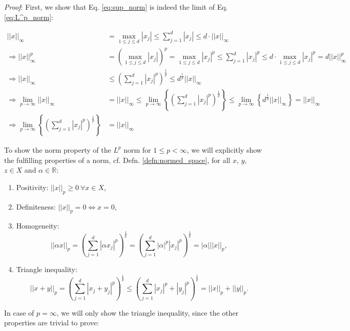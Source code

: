 \documentclass[12pt, a4paper]{article}
\numberwithin{equation}{section}
\theoremstyle{definition}
\theoremstyle{definition}
\newcommand{\norm}[2]{\left\vert\left\vert #1 \right\vert\right\vert_{#2}}
\newcommand{\abs}[1]{\left\vert #1 \right\vert}
\begin{document}
	\noindent\textit{Proof}: First, we show that Eq. \eqref{eq:sup_norm} is indeed the limit of Eq. \eqref{eq:L^p_norm}:
	
	\begin{align}
		\norm{x}{\infty} &= \max_{1\leq j\leq d}{\abs{x_j}} \leq \sum_{j=1}^{d}\abs{x_j} \leq d \cdot \norm{x}{\infty}
		\\ \Rightarrow \norm{x}{\infty}^p &= \left(\max_{1\leq j\leq d}{\abs{x_j}}\right)^p = \max_{1\leq j\leq d}{\abs{x_j}^p} \leq \sum_{j=1}^{d}\abs{x_j}^p \leq d \cdot \max_{1\leq j\leq d}{\abs{x_j}^p} = d\norm{x}{\infty}^p
		\\ \Rightarrow \norm{x}{\infty} &\leq \left(\sum_{j=1}^{d}\abs{x_j}^p\right)^{\frac{1}{p}} \leq d^{\frac{1}{p}}\norm{x}{\infty}
		\\ \Rightarrow \lim\limits_{p\to\infty}\norm{x}{\infty} &= \norm{x}{\infty} \leq \lim\limits_{p\to\infty}\left\{\left(\sum_{j=1}^{d}\abs{x_j}^p\right)^{\frac{1}{p}}\right\} \leq \lim\limits_{p\to\infty}\left\{d^{\frac{1}{p}}\norm{x}{\infty}\right\} = \norm{x}{\infty}
		\\ \Rightarrow \lim\limits_{p\to\infty}\left\{\left(\sum_{j=1}^{d}\abs{x_j}^p\right)^{\frac{1}{p}}\right\} &= \norm{x}{\infty}
	\end{align}

	To show the norm property of the $L^p$ norm for $1 \leq p < \infty$, we will explicitly show the fulfilling properties of a norm, cf. Defn. \eqref{defn:normed_space}, for all $x$, $y$, $z\in X$ and $\alpha\in \mathbb{R}$:

	\begin{enumerate}
		\item Positivity: $\norm{x}{p} \geq 0 \ \forall x\in X$,
		\item Definiteness: $\norm{x}{p} = 0\Leftrightarrow x = 0$,
		\item Homogeneity: $$\norm{\alpha x}{p} = \left(\sum_{j=1}^{d}\abs{\alpha x_j}^p\right)^{\frac{1}{p}} = \left(\sum_{j=1}^{d}\abs{\alpha}^p\abs{x_j}^p\right)^{\frac{1}{p}} = \abs{\alpha}\norm{x}{p},$$
		\item Triangle inequality: $$\norm{x + y}{p} = \left(\sum_{j=1}^{d}\abs{x_j + y_j}^p\right)^{\frac{1}{p}} \leq \left(\sum_{j=1}^{d}\abs{x_j}^p + \abs{y_j}^p\right)^{\frac{1}{p}} = \norm{x}{p} + \norm{y}{p}.$$	
	\end{enumerate}
	
	In case of $p = \infty$, we will only show the triangle inequality, since the other properties are trivial to prove:
	
\end{document}
